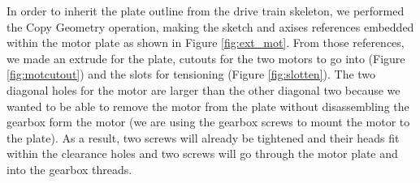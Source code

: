 In order to inherit the plate outline from the drive train skeleton, we performed the Copy Geometry operation, making the sketch and axises references embedded within the motor plate as shown in Figure \ref{fig:ext_mot}. From those references, we made an extrude for the plate, cutouts for the two motors to go into (Figure \ref{fig:motcutout}) and the slots for tensioning (Figure \ref{fig:slotten}). The two diagonal holes for the motor are larger than the other diagonal two because we wanted to be able to remove the motor from the plate without disassembling the gearbox form the motor (we are using the gearbox screws to mount the motor to the plate). As a result, two screws will already be tightened and their heads fit within the clearance holes and two screws will go through the motor plate and into the gearbox threads.







